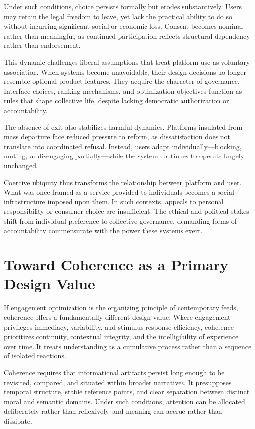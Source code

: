 \documentclass[12pt]{article}
\begin{document}
Under such conditions, choice persists formally but erodes substantively. Users may retain the legal freedom to leave, yet lack the practical ability to do so without incurring significant social or economic loss. Consent becomes nominal rather than meaningful, as continued participation reflects structural dependency rather than endorsement.

This dynamic challenges liberal assumptions that treat platform use as voluntary association. When systems become unavoidable, their design decisions no longer resemble optional product features. They acquire the character of governance. Interface choices, ranking mechanisms, and optimization objectives function as rules that shape collective life, despite lacking democratic authorization or accountability.

The absence of exit also stabilizes harmful dynamics. Platforms insulated from mass departure face reduced pressure to reform, as dissatisfaction does not translate into coordinated refusal. Instead, users adapt individually—blocking, muting, or disengaging partially—while the system continues to operate largely unchanged.

Coercive ubiquity thus transforms the relationship between platform and user. What was once framed as a service provided to individuals becomes a social infrastructure imposed upon them. In such contexts, appeals to personal responsibility or consumer choice are insufficient. The ethical and political stakes shift from individual preference to collective governance, demanding forms of accountability commensurate with the power these systems exert.

\section{Toward Coherence as a Primary Design Value}

If engagement optimization is the organizing principle of contemporary feeds, coherence offers a fundamentally different design value. Where engagement privileges immediacy, variability, and stimulus-response efficiency, coherence prioritizes continuity, contextual integrity, and the intelligibility of experience over time. It treats understanding as a cumulative process rather than a sequence of isolated reactions.

Coherence requires that informational artifacts persist long enough to be revisited, compared, and situated within broader narratives. It presupposes temporal structure, stable reference points, and clear separation between distinct moral and semantic domains. Under such conditions, attention can be allocated deliberately rather than reflexively, and meaning can accrue rather than dissipate.
\end{document}
